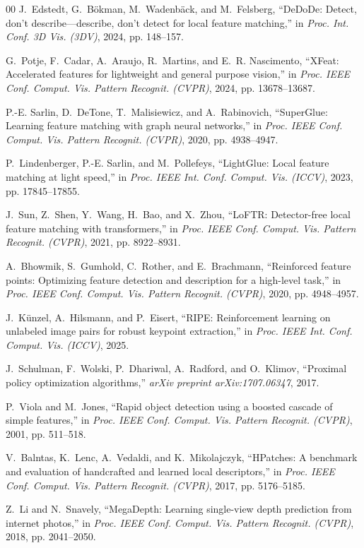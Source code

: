\documentclass[conference]{IEEEtran}
\begin{document}
\begin{thebibliography}{00}
J.~Edstedt, G.~B{\"o}kman, M.~Wadenb{\"a}ck, and M.~Felsberg, ``DeDoDe: Detect, don't describe---describe, don't detect for local feature matching,'' in \textit{Proc. Int. Conf. 3D Vis. (3DV)}, 2024, pp. 148--157.

G.~Potje, F.~Cadar, A.~Araujo, R.~Martins, and E.~R. Nascimento, ``XFeat: Accelerated features for lightweight and general purpose vision,'' in \textit{Proc. IEEE Conf. Comput. Vis. Pattern Recognit. (CVPR)}, 2024, pp. 13678--13687.

P.-E. Sarlin, D.~DeTone, T.~Malisiewicz, and A.~Rabinovich, ``SuperGlue: Learning feature matching with graph neural networks,'' in \textit{Proc. IEEE Conf. Comput. Vis. Pattern Recognit. (CVPR)}, 2020, pp. 4938--4947.

P.~Lindenberger, P.-E. Sarlin, and M.~Pollefeys, ``LightGlue: Local feature matching at light speed,'' in \textit{Proc. IEEE Int. Conf. Comput. Vis. (ICCV)}, 2023, pp. 17845--17855.

J.~Sun, Z.~Shen, Y.~Wang, H.~Bao, and X.~Zhou, ``LoFTR: Detector-free local feature matching with transformers,'' in \textit{Proc. IEEE Conf. Comput. Vis. Pattern Recognit. (CVPR)}, 2021, pp. 8922--8931.

A.~Bhowmik, S.~Gumhold, C.~Rother, and E.~Brachmann, ``Reinforced feature points: Optimizing feature detection and description for a high-level task,'' in \textit{Proc. IEEE Conf. Comput. Vis. Pattern Recognit. (CVPR)}, 2020, pp. 4948--4957.

J.~K{\"u}nzel, A.~Hilsmann, and P.~Eisert, ``RIPE: Reinforcement learning on unlabeled image pairs for robust keypoint extraction,'' in \textit{Proc. IEEE Int. Conf. Comput. Vis. (ICCV)}, 2025.

J.~Schulman, F.~Wolski, P.~Dhariwal, A.~Radford, and O.~Klimov, ``Proximal policy optimization algorithms,'' \textit{arXiv preprint arXiv:1707.06347}, 2017.

P.~Viola and M.~Jones, ``Rapid object detection using a boosted cascade of simple features,'' in \textit{Proc. IEEE Conf. Comput. Vis. Pattern Recognit. (CVPR)}, 2001, pp. 511--518.

V.~Balntas, K.~Lenc, A.~Vedaldi, and K.~Mikolajczyk, ``HPatches: A benchmark and evaluation of handcrafted and learned local descriptors,'' in \textit{Proc. IEEE Conf. Comput. Vis. Pattern Recognit. (CVPR)}, 2017, pp. 5176--5185.

Z.~Li and N.~Snavely, ``MegaDepth: Learning single-view depth prediction from internet photos,'' in \textit{Proc. IEEE Conf. Comput. Vis. Pattern Recognit. (CVPR)}, 2018, pp. 2041--2050.

\end{thebibliography}
\end{document}

